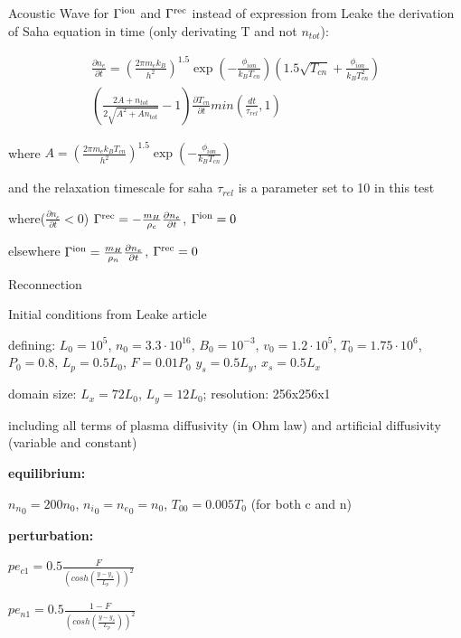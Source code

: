 \documentclass{beamer}
\begin{document}
\begin{frame}{Acoustic Wave}
for $\Gamma^{\rm ion}$ and $\Gamma^{\rm rec}$ instead of expression from Leake the derivation of Saha equation in time (only derivating T and not $n_{tot}$):

\begin{eqnarray} \nonumber
\frac{\partial n_e}{\partial t} = 
\left (\frac{2  \pi  m_e  k_B}{h^2} \right )^{1.5} \exp \left (-\frac{\phi_{ion}} {k_B T_{cn}} \right )
      \left (1.5  \sqrt{T_{cn}}  + \frac{\phi_{ion}}{k_B T_{cn}^2 } \right) \\ 
     \left ( \frac{2 A+ n_{tot}}{2 \sqrt{A^2 + A n_{tot}} } - 1 \right)\frac{\partial T_{cn}}{\partial t} 
       min \left (\frac{dt}{\tau_{rel}},1 \right )
\end{eqnarray}

				where $A = \left (\frac{2  \pi  m_e  k_B  T_{cn}}{h^2} \right )^{1.5}  \exp \left (-\frac{\phi_{ion}} { k_B  T_{cn}} \right)$

and the relaxation timescale for saha $\tau_{rel}$ is a  parameter set to 10 in this test

     where($\frac{\partial n_e}{\partial t} <0$) $\Gamma^{\rm rec} = -\frac{m_H}{\rho_c}  \frac{\partial n_e}{\partial t} $, $\Gamma^{\rm ion} = 0 $

     elsewhere $\Gamma^{\rm ion} = \frac{m_H}{\rho_n} \frac{\partial n_e}{\partial t} $, $\Gamma^{\rm rec} = 0 $

\end{frame}




\begin{frame}{Reconnection}

Initial conditions from Leake article

defining:
$L_0 =10^{5}$,
$n_0 = 3.3\cdot 10^{16}$,
$B_0 = 10^{-3}$, 
$v_0 = 1.2\cdot 10^5$, 
$T_0 = 1.75\cdot 10^6$, 
$P_0 = 0.8$,
$L_p = 0.5  L_0$,
$F = 0.01  P_0$
$y_s = 0.5 L_y$,
$x_s = 0.5 L_x$

domain size:
$L_x = 72 L_0$,
$L_y = 12 L_0$;
resolution: 256x256x1

including all terms of plasma diffusivity (in Ohm law)  and artificial diffusivity (variable and constant)

{\bf equilibrium:}

${n_n}_0 = 200 n_0$,
${n_i}_0 = {n_e}_0 = n_0$, 
$T_{00} = 0.005  T_0$ (for both c and n)


{\bf perturbation:}

$pe_{c1} = 0.5 \frac{ F}{ (cosh \left( \frac{y-y_s}{L_p} \right ))^2}$

$pe_{n1} = 0.5 \frac{1-F} { (cosh \left( \frac{y-y_s}{L_p} \right ))^2}$


\end{frame}
\end{document}

